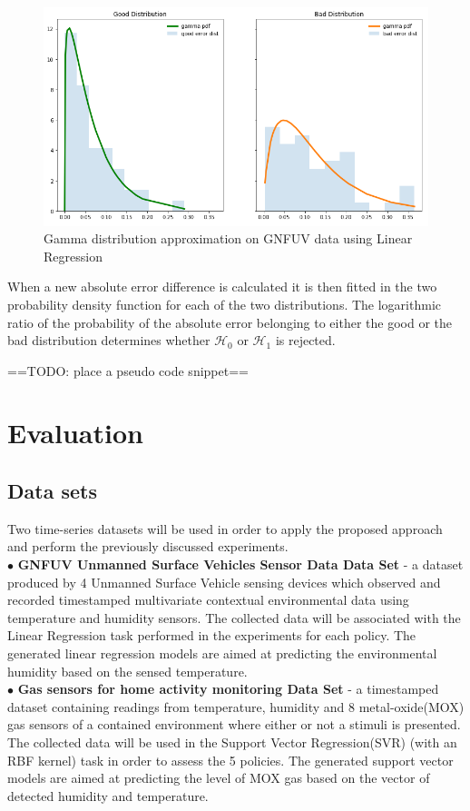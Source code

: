 \documentclass{mpaper}
\begin{document}
\begin{figure}[h]
    \centering
    \includegraphics[scale=0.3]{imgs/goodVSbad.png}
    \caption{Gamma distribution approximation on GNFUV data using Linear Regression}
    \label{fig:goodvsbad}
\end{figure}

When a new absolute error difference is calculated it is then fitted in the two probability density function for each of the two distributions. The logarithmic ratio of the probability of the absolute error belonging to either the good or the bad distribution determines whether $\mathcal{H}_0$ or $\mathcal{H}_1$ is rejected.

==TODO: place a pseudo code snippet==

\section{Evaluation}

\subsection*{Data sets}
Two time-series datasets will be used in order to apply the proposed approach and perform the previously discussed experiments.
\\$\bullet$ \textbf{GNFUV Unmanned Surface Vehicles Sensor Data Data Set} \cite{harth2018} - a dataset produced by 4 Unmanned Surface Vehicle sensing devices which observed and recorded timestamped multivariate contextual environmental data using temperature and humidity sensors. The collected data will be associated with the Linear Regression task performed in the experiments for each policy. The generated linear regression models are aimed at predicting the environmental humidity based on the sensed temperature.
\\$\bullet$ \textbf{Gas sensors for home activity monitoring Data Set } \cite{HUERTA2016169} - a timestamped dataset containing readings from temperature, humidity and 8 metal-oxide(MOX) gas sensors of a contained environment where either or not a stimuli is presented. The collected data will be used in the Support Vector Regression(SVR) (with an RBF kernel) task in order to assess the 5 policies. The generated support vector models are aimed at predicting the level of MOX gas based on the vector of detected humidity and temperature.
\end{document}
